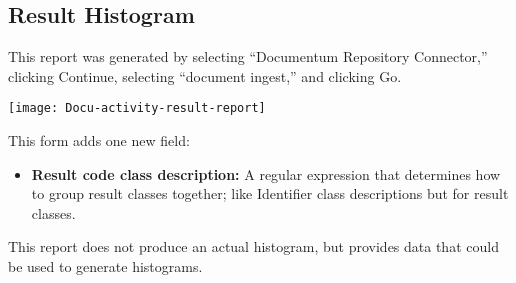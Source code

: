 \begin{changemargin}{1.5in}{0in}
\subsection{Result Histogram}

This report was generated by selecting ``Documentum Repository Connector,''
clicking Continue, selecting ``document ingest,'' and clicking Go.

\texttt{[image: Docu-activity-result-report]}

This form adds one new field:

\begin{itemize}

\item \textbf{Result code class description:} A regular expression that
determines how to group result classes together; like Identifier class
descriptions but for result classes.

\end{itemize}

This report does not produce an actual histogram, but provides data that
could be used to generate histograms.  


\end{changemargin}
